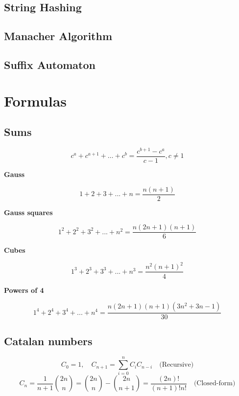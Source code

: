\documentclass[10pt]{article}
\begin{document}
\begin{multicols*}{2}
\subsection{String Hashing}


\subsection{Manacher Algorithm}


\subsection{Suffix Automaton}



\section{Formulas}

\subsection{Sums}

\[
c^a+c^{a+1}+\dots + c^b = \frac{c^{b+1}-c^a}{c-1}, c\neq 1
\]

\textbf{Gauss}

\[
1+2+3+...+n = \frac{n(n+1)}{2}
\]

\textbf{Gauss squares}

\[
1^2+2^2+3^2+...+n^2 = \frac{n(2n+1)(n+1)}{6}
\]

\textbf{Cubes}

\[
1^3+2^3+3^3+...+n^3 = \frac{n^2(n+1)^2}{4}
\]

\textbf{Powers of 4}

\[
1^4+2^4+3^4+...+n^4 = \frac{n(2n+1)(n+1)(3n^2+3n-1)}{30}
\]

\subsection{Catalan numbers}
\[
C_0 = 1, \quad C_{n+1} = \sum_{i=0}^{n} C_i C_{n-i} \quad \text{(Recursive)}
\]
\[
C_n = \frac{1}{n+1} \binom{2n}{n} = \binom{2n}{n} - \binom{2n}{n+1} = \frac{(2n)!}{(n+1)!n!} \quad \text{(Closed-form)}
\]


\end{multicols*}
\end{document}
